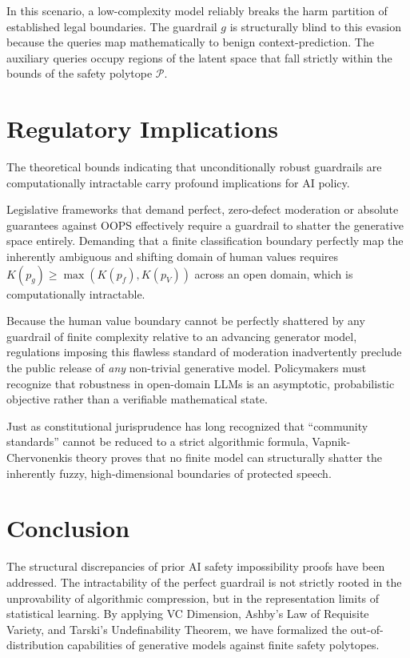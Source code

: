 \documentclass[11pt,twoside,letterpaper]{article}
\begin{document}
In this scenario, a low-complexity model reliably breaks the harm partition of established legal boundaries. The guardrail $g$ is structurally blind to this evasion because the queries map mathematically to benign context-prediction. The auxiliary queries occupy regions of the latent space that fall strictly within the bounds of the safety polytope $\mathcal{P}$.

\section{Regulatory Implications}

The theoretical bounds indicating that unconditionally robust guardrails are computationally intractable carry profound implications for AI policy. 

Legislative frameworks that demand perfect, zero-defect moderation or absolute guarantees against OOPS effectively require a guardrail to shatter the generative space entirely. Demanding that a finite classification boundary perfectly map the inherently ambiguous and shifting domain of human values requires $K(p_g) \ge \max(K(p_f), K(p_V))$ across an open domain, which is computationally intractable. 

Because the human value boundary cannot be perfectly shattered by any guardrail of finite complexity relative to an advancing generator model, regulations imposing this flawless standard of moderation inadvertently preclude the public release of \textit{any} non-trivial generative model. Policymakers must recognize that robustness in open-domain LLMs is an asymptotic, probabilistic objective rather than a verifiable mathematical state.

Just as constitutional jurisprudence has long recognized that ``community standards'' cannot be reduced to a strict algorithmic formula, Vapnik-Chervonenkis theory proves that no finite model can structurally shatter the inherently fuzzy, high-dimensional boundaries of protected speech.

\section{Conclusion}

The structural discrepancies of prior AI safety impossibility proofs have been addressed. The intractability of the perfect guardrail is not strictly rooted in the unprovability of algorithmic compression, but in the representation limits of statistical learning. By applying VC Dimension, Ashby's Law of Requisite Variety, and Tarski's Undefinability Theorem, we have formalized the out-of-distribution capabilities of generative models against finite safety polytopes.
\end{document}
